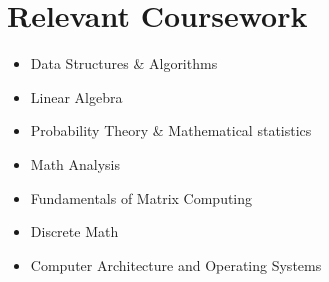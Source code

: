 \section{Relevant Coursework}
\begin{multicols}{4}
    \begin{itemize}[itemsep=0pt, parsep=0pt, leftmargin=*]
        \item Data Structures \& Algorithms
        \item Linear Algebra
        \item Probability Theory \& Mathematical statistics
        \item Math Analysis
        \item Fundamentals of Matrix Computing
        \item Discrete Math
        \item Computer Architecture and Operating Systems
    \end{itemize}
\end{multicols}
